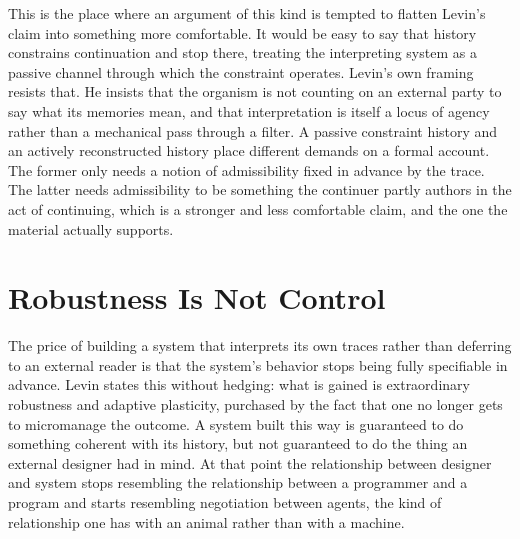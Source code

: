 \documentclass[11pt]{article}
\begin{document}
This is the place where an argument of this kind is tempted to flatten Levin's claim into something more comfortable. It would be easy to say that history constrains continuation and stop there, treating the interpreting system as a passive channel through which the constraint operates. Levin's own framing resists that. He insists that the organism is not counting on an external party to say what its memories mean, and that interpretation is itself a locus of agency rather than a mechanical pass through a filter. A passive constraint history and an actively reconstructed history place different demands on a formal account. The former only needs a notion of admissibility fixed in advance by the trace. The latter needs admissibility to be something the continuer partly authors in the act of continuing, which is a stronger and less comfortable claim, and the one the material actually supports.

\section{Robustness Is Not Control}

The price of building a system that interprets its own traces rather than deferring to an external reader is that the system's behavior stops being fully specifiable in advance. Levin states this without hedging: what is gained is extraordinary robustness and adaptive plasticity, purchased by the fact that one no longer gets to micromanage the outcome. A system built this way is guaranteed to do something coherent with its history, but not guaranteed to do the thing an external designer had in mind. At that point the relationship between designer and system stops resembling the relationship between a programmer and a program and starts resembling negotiation between agents, the kind of relationship one has with an animal rather than with a machine.
\end{document}
